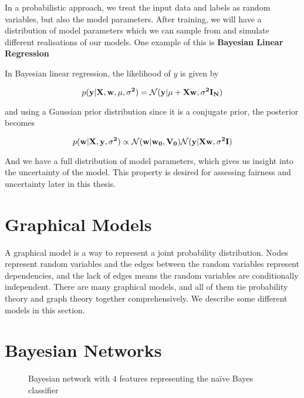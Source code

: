 In a probabilistic approach, we treat the input data and labels as random variables, but also the model parameters. After training, we will have a distribution of model parameters which we can sample from and simulate different realisations of our models. One example of this is \textbf{Bayesian Linear Regression}

In Bayesian linear regression, the likelihood of $y$ is given by \cite[p.~232]{Murphy:2012:Book}

\begin{equation*}
    p(\bf{y}|\bf{X}, \bf{w}, \mu, \sigma^2) = \mathcal{N}(\bf{y}|\mu + \bf{X}\bf{w}, \sigma^2 \bf{I}_N)
\end{equation*}

and using a Gaussian prior distribution since it is a conjugate prior, the posterior becomes \cite[p.~232]{Murphy:2012:Book}

\begin{equation*}
    p(\bf{w}|\bf{X}, \bf{y}, \sigma^2) \propto \mathcal{N}(\bf{w}|\bf{w_0}, \bf{V_0}) \mathcal{N}(\bf{y}|\bf{Xw}, \sigma^2\bf{I})
\end{equation*}

And we have a full distribution of model parameters, which gives us insight into the uncertainty of the model. This property is desired for assessing fairness and uncertainty later in this thesis.

\section{Graphical Models}

A graphical model is a way to represent a joint probability distribution. Nodes represent random variables and the edges between the random variables represent dependencies, and the lack of edges means the random variables are conditionally independent. \cite[p.~308]{Murphy:2012:Book} There are many graphical models, and all of them tie probability theory and graph theory together comprehensively. We describe some different models in this section.

\section{Bayesian Networks}

\begin{figure}[h!]
    \centering
    \caption{Bayesian network with $4$ features representing the naïve Bayes classifier}
    \label{fig:my_label}
\end{figure}

